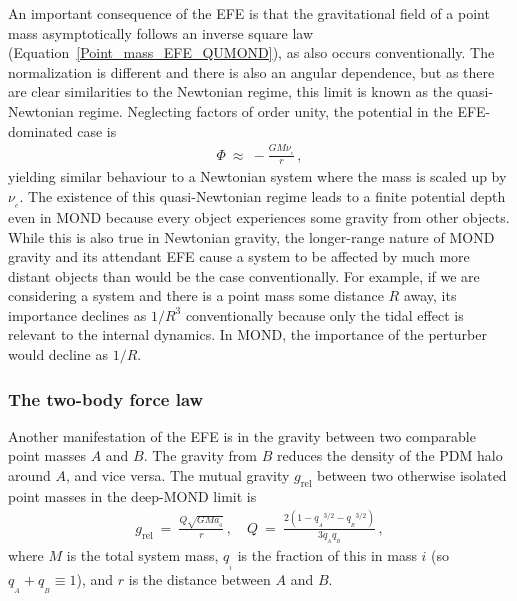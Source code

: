 \documentclass[fleqn,usenatbib,useAMS]{mnras} %
\begin{document}
An important consequence of the EFE is that the gravitational field of a point mass asymptotically follows an inverse square law (Equation~\ref{Point_mass_EFE_QUMOND}), as also occurs conventionally. The normalization is different and there is also an angular dependence, but as there are clear similarities to the Newtonian regime, this limit is known as the quasi-Newtonian regime. Neglecting factors of order unity, the potential in the EFE-dominated case is
\begin{eqnarray}
	\Phi ~\approx~ -\frac{GM\nu_{_e}}{r} \, ,
\end{eqnarray}
yielding similar behaviour to a Newtonian system where the mass is scaled up by $\nu_{_e}$. The existence of this quasi-Newtonian regime leads to a finite potential depth even in MOND because every object experiences some gravity from other objects. While this is also true in Newtonian gravity, the longer-range nature of MOND gravity and its attendant EFE cause a system to be affected by much more distant objects than would be the case conventionally. For example, if we are considering a system and there is a point mass some distance $R$ away, its importance declines as $1/R^3$ conventionally because only the tidal effect is relevant to the internal dynamics. In MOND, the importance of the perturber would decline as $1/R$.


\subsubsection{The two-body force law}
\label{Two_body_force}

Another manifestation of the EFE is in the gravity between two comparable point masses $A$ and $B$. The gravity from $B$ reduces the density of the PDM halo around $A$, and vice versa. The mutual gravity $g_\text{rel}$ between two otherwise isolated point masses in the deep-MOND limit is \citep{Zhao_2010_two_body}
\begin{eqnarray}
	g_\text{rel} ~=~ \frac{Q\sqrt{GMa_{_0}}}{r} \, , \quad Q ~=~ \frac{2 \left( 1 - {q_{_A}}^{3/2} - {q_{_B}}^{3/2} \right)}{3 q_{_A} q_{_B}} \, ,
	\label{Two_body_force_law_DML}
\end{eqnarray}
where $M$ is the total system mass, $q_{_i}$ is the fraction of this in mass $i$ (so $q_{_A} + q_{_B} \equiv 1$), and $r$ is the distance between $A$ and $B$.
\end{document}
